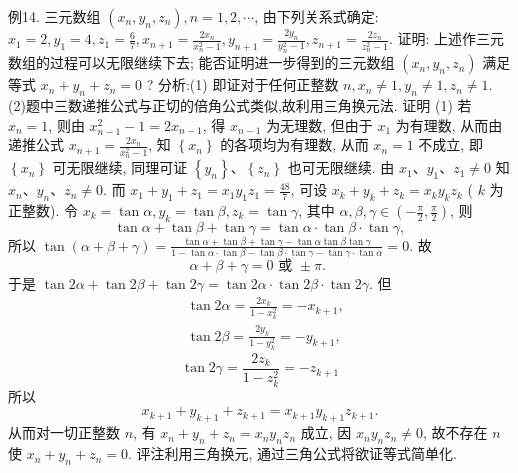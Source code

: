 例14. 三元数组 $\left(x_n, y_n, z_n\right), n=1,2, \cdots$, 由下列关系式确定: $x_1= 2, y_1=4, z_1=\frac{6}{7}, x_{n+1}=\frac{2 x_n}{x_n^2-1}, y_{n+1}=\frac{2 y_n}{y_n^2-1}, z_{n+1}=\frac{2 z_n}{z_n^2-1}$.
 证明: 上述作三元数组的过程可以无限继续下去;
 能否证明进一步得到的三元数组 $\left(x_n, y_n, z_n\right)$ 满足等式 $x_n+y_n+ z_n=0$ ?
分析:(1) 即证对于任何正整数 $n, x_n \neq 1, y_n \neq 1, z_n \neq 1$.
 (2)题中三数递推公式与正切的倍角公式类似,故利用三角换元法.
证明 (1) 若 $x_n=1$, 则由 $x_{n-1}^2-1=2 x_{n-1}$, 得 $x_{n-1}$ 为无理数, 但由于 $x_1$ 为有理数, 从而由递推公式 $x_{n+1}=\frac{2 x_n}{x_n^2-1}$, 知 $\left\{x_n\right\}$ 的各项均为有理数, 从而 $x_n=1$ 不成立, 即 $\left\{x_n\right\}$ 可无限继续, 同理可证 $\left\{y_n\right\} 、\left\{z_n\right\}$ 也可无限继续.
 由 $x_1 、 y_1 、 z_1 \neq 0$ 知 $x_n 、 y_n 、 z_n \neq 0$.
而 $x_1+y_1+z_1=x_1 y_1 z_1=\frac{48}{7}$, 可设 $x_k+y_k+z_k=x_k y_k z_k$ ( $k$ 为正整数). 令 $x_k=\tan \alpha, y_k=\tan \beta, z_k=\tan \gamma$, 其中 $\alpha, \beta, \gamma \in\left(-\frac{\pi}{2}, \frac{\pi}{2}\right)$, 则
$$
\tan \alpha+\tan \beta+\tan \gamma=\tan \alpha \cdot \tan \beta \cdot \tan \gamma,
$$
所以 $\tan (\alpha+\beta+\gamma)=\frac{\tan \alpha+\tan \beta+\tan \gamma-\tan \alpha \tan \beta \tan \gamma}{1-\tan \alpha \cdot \tan \beta-\tan \beta \cdot \tan \gamma-\tan \gamma \cdot \tan \alpha}=0$. 故
$$
\alpha+\beta+\gamma=0 \text { 或 } \pm \pi \text {. }
$$
于是 $\tan 2 \alpha+\tan 2 \beta+\tan 2 \gamma=\tan 2 \alpha \cdot \tan 2 \beta \cdot \tan 2 \gamma$.
但
$$
\begin{aligned}
& \tan 2 \alpha=\frac{2 x_k}{1-x_k^2}=-x_{k+1}, \\
& \tan 2 \beta=\frac{2 y_k}{1-y_k^2}=-y_{k+1},
\end{aligned}
$$
$$
\tan 2 \gamma=\frac{2 z_k}{1-z_k^2}=-z_{k+1}
$$
所以
$$
x_{k+1}+y_{k+1}+z_{k+1}=x_{k+1} y_{k+1} z_{k+1} .
$$
从而对一切正整数 $n$, 有 $x_n+y_n+z_n=x_n y_n z_n$ 成立, 因 $x_n y_n z_n \neq 0$, 故不存在 $n$ 使 $x_n+y_n+z_n=0$.
评注利用三角换元, 通过三角公式将欲证等式简单化.



